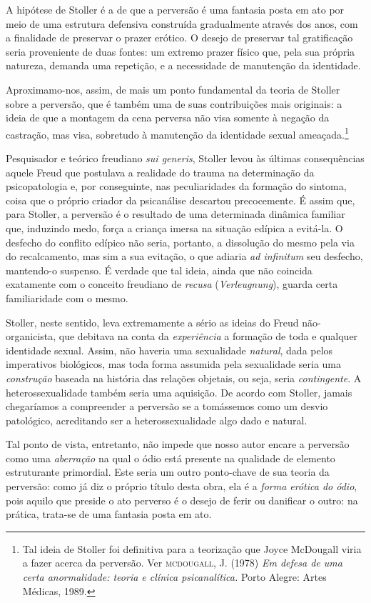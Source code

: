 A hipótese de Stoller é a de que a perversão é uma fantasia posta em ato por
meio de uma estrutura defensiva construída gradualmente através dos anos,
com a finalidade de preservar o prazer erótico. O desejo de preservar tal
gratificação seria proveniente de duas fontes: um extremo prazer físico
que, pela sua própria natureza, demanda uma repetição, e a necessidade de
manutenção da identidade.

Aproximamo-nos, assim, de mais um ponto fundamental da teoria de Stoller
sobre a perversão, que é também uma de suas contribuições mais originais: a
ideia de que a montagem da cena perversa não visa somente à negação da
castração, mas visa, sobretudo à manutenção da identidade sexual
ameaçada.\footnote{ Tal ideia de Stoller foi definitiva para a teorização
que Joyce McDougall viria a fazer acerca da perversão. Ver \textsc{mcdougall}, J. (1978)  
\textit{Em defesa de uma certa anormalidade: teoria e clínica psicanalítica.} 
Porto Alegre: Artes Médicas, 1989.}

Pesquisador e teórico freudiano \textit{sui generis}, Stoller levou às
últimas consequências aquele Freud que postulava a realidade do trauma na
determinação da psicopatologia e, por conseguinte, nas peculiaridades da
formação do sintoma, coisa que o próprio criador da psicanálise descartou
precocemente. É assim que, para Stoller, a perversão é o resultado de uma
determinada dinâmica familiar que, induzindo medo, força a criança imersa
na situação edípica a evitá-la. O desfecho do conflito edípico não seria,
portanto, a dissolução do mesmo pela via do recalcamento, mas sim a sua
evitação, o que adiaria \textit{ad infinitum} seu desfecho, mantendo-o
suspenso. É verdade que tal ideia, ainda que não coincida exatamente com o
conceito freudiano de \textit{recusa} (\textit{Verleugnung}), guarda certa
familiaridade com o mesmo.

Stoller, neste sentido, leva extremamente a sério as ideias do Freud
não-organicista, que debitava na conta da \textit{experiência} a formação
de toda e qualquer identidade sexual. Assim, não haveria uma sexualidade
\textit{natural}, dada pelos imperativos biológicos, mas toda forma
assumida pela sexualidade seria uma \textit{construção} baseada na história
das relações objetais, ou seja, seria \textit{contingente}. A
heterossexualidade também seria uma aquisição. De acordo com Stoller,
jamais chegaríamos a compreender a perversão se a tomássemos como um desvio
patológico, acreditando ser a heterossexualidade algo dado e natural.

Tal ponto de vista, entretanto, não impede que nosso autor encare a
perversão como uma \textit{aberração} na qual o ódio está presente na
qualidade de elemento estruturante primordial. Este seria um outro
ponto-chave de sua teoria da perversão: como já diz o próprio título desta
obra, ela é a \textit{forma erótica do ódio}, pois aquilo que preside o ato
perverso é o desejo de ferir ou danificar o outro: na prática, trata-se de
uma fantasia posta em ato.


